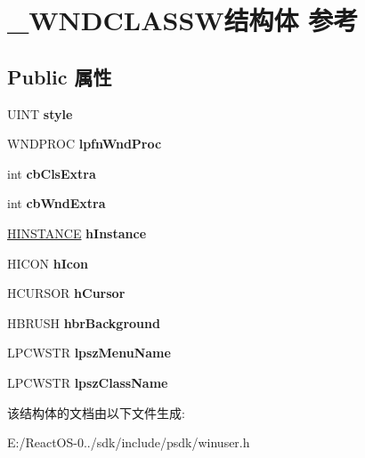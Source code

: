 \hypertarget{struct___w_n_d_c_l_a_s_s_w}{}\section{\+\_\+\+W\+N\+D\+C\+L\+A\+S\+S\+W结构体 参考}
\label{struct___w_n_d_c_l_a_s_s_w}
\subsection*{Public 属性}
\begin{DoxyCompactItemize}
\item 
\mbox{\label{struct___w_n_d_c_l_a_s_s_w_ab0df34af70b9976d27665373ae69bc26}} 
U\+I\+NT {\bfseries style}
\item 
\mbox{\label{struct___w_n_d_c_l_a_s_s_w_ab648eb59df76bd1342b9748a50b47ac6}} 
W\+N\+D\+P\+R\+OC {\bfseries lpfn\+Wnd\+Proc}
\item 
\mbox{\label{struct___w_n_d_c_l_a_s_s_w_aa1fb5a435f68cf614fa6d67dc0ecab48}} 
int {\bfseries cb\+Cls\+Extra}
\item 
\mbox{\label{struct___w_n_d_c_l_a_s_s_w_abec40d1ee751e58fef6342755ab95f80}} 
int {\bfseries cb\+Wnd\+Extra}
\item 
\mbox{\label{struct___w_n_d_c_l_a_s_s_w_a7ba9e60544c03b8875e28971227a597d}} 
\hyperlink{interfacevoid}{H\+I\+N\+S\+T\+A\+N\+CE} {\bfseries h\+Instance}
\item 
\mbox{\label{struct___w_n_d_c_l_a_s_s_w_a2b7a77aadd767f212a4d64e93b329e5a}} 
H\+I\+C\+ON {\bfseries h\+Icon}
\item 
\mbox{\label{struct___w_n_d_c_l_a_s_s_w_abfcb1d48ec4c30e222ed6277fe15b0b8}} 
H\+C\+U\+R\+S\+OR {\bfseries h\+Cursor}
\item 
\mbox{\label{struct___w_n_d_c_l_a_s_s_w_a2042d58fa8ff749ca3d61c12a28c23d1}} 
H\+B\+R\+U\+SH {\bfseries hbr\+Background}
\item 
\mbox{\label{struct___w_n_d_c_l_a_s_s_w_a16b099ca6a309d2672d1df74f9d396e3}} 
L\+P\+C\+W\+S\+TR {\bfseries lpsz\+Menu\+Name}
\item 
\mbox{\label{struct___w_n_d_c_l_a_s_s_w_a0c07160b0fc0abe5ef531dff99e45161}} 
L\+P\+C\+W\+S\+TR {\bfseries lpsz\+Class\+Name}
\end{DoxyCompactItemize}


该结构体的文档由以下文件生成\+:\begin{DoxyCompactItemize}
\item 
E\+:/\+React\+O\+S-\/0../sdk/include/psdk/winuser.\+h\end{DoxyCompactItemize}
